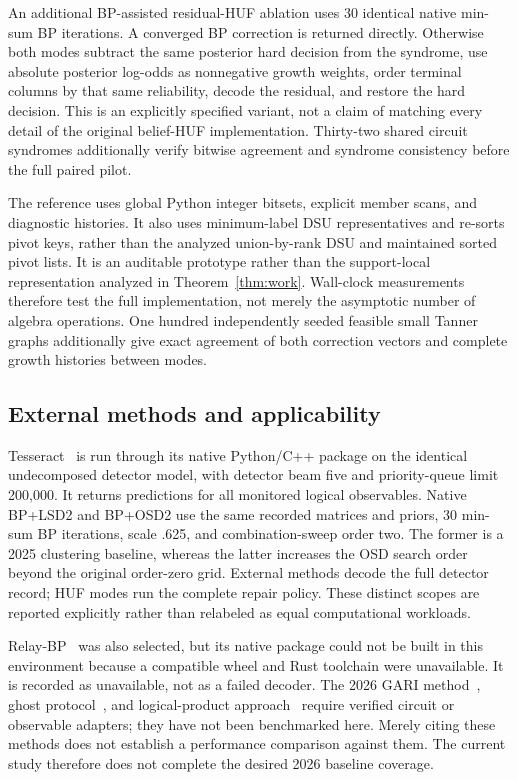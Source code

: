 An additional BP-assisted residual-HUF ablation uses 30 identical native min-sum BP iterations. A converged BP correction is returned directly. Otherwise both modes subtract the same posterior hard decision from the syndrome, use absolute posterior log-odds as nonnegative growth weights, order terminal columns by that same reliability, decode the residual, and restore the hard decision. This is an explicitly specified variant, not a claim of matching every detail of the original belief-HUF implementation. Thirty-two shared circuit syndromes additionally verify bitwise agreement and syndrome consistency before the full paired pilot.

The reference uses global Python integer bitsets, explicit member scans, and diagnostic histories. It also uses minimum-label DSU representatives and re-sorts pivot keys, rather than the analyzed union-by-rank DSU and maintained sorted pivot lists. It is an auditable prototype rather than the support-local representation analyzed in Theorem~\ref{thm:work}. Wall-clock measurements therefore test the full implementation, not merely the asymptotic number of algebra operations. One hundred independently seeded feasible small Tanner graphs additionally give exact agreement of both correction vectors and complete growth histories between modes.

\subsection{External methods and applicability}
Tesseract~\cite{tesseract} is run through its native Python/C++ package on the identical undecomposed detector model, with detector beam five and priority-queue limit 200,000. It returns predictions for all monitored logical observables. Native BP+LSD2 and BP+OSD2 use the same recorded matrices and priors, 30 min-sum BP iterations, scale .625, and combination-sweep order two. The former is a 2025 clustering baseline, whereas the latter increases the OSD search order beyond the original order-zero grid. External methods decode the full detector record; HUF modes run the complete repair policy. These distinct scopes are reported explicitly rather than relabeled as equal computational workloads.

Relay-BP~\cite{relay} was also selected, but its native package could not be built in this environment because a compatible wheel and Rust toolchain were unavailable. It is recorded as unavailable, not as a failed decoder. The 2026 GARI method~\cite{gari}, ghost protocol~\cite{ghost}, and logical-product approach~\cite{fast} require verified circuit or observable adapters; they have not been benchmarked here. Merely citing these methods does not establish a performance comparison against them. The current study therefore does not complete the desired 2026 baseline coverage.

